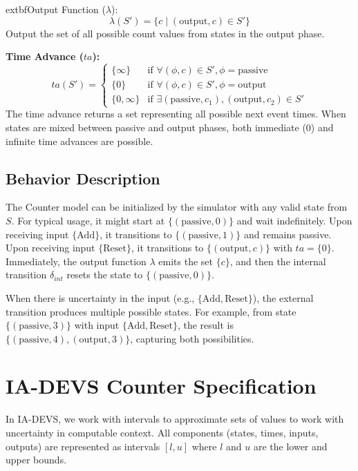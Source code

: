 \bigskip

	extbf{Output Function ($\lambda$):}
\[
\lambda(S') = \{c \mid (\text{output}, c) \in S'\}
\]
Output the set of all possible count values from states in the output phase.

\bigskip

\textbf{Time Advance ($ta$):}
\[
ta(S') = \begin{cases}
    \{\infty\} & \text{if } \forall (\phi, c) \in S', \phi = \text{passive} \\
    \{0\} & \text{if } \forall (\phi, c) \in S', \phi = \text{output} \\
    \{0, \infty\} & \text{if } \exists (\text{passive}, c_1), (\text{output}, c_2) \in S'
\end{cases}
\]
The time advance returns a set representing all possible next event times. When states are mixed between passive and output phases, both immediate (0) and infinite time advances are possible.

\subsection{Behavior Description}

The Counter model can be initialized by the simulator with any valid state from $S$. For typical usage, it might start at $\{(\text{passive}, 0)\}$ and wait indefinitely. Upon receiving input $\{\text{Add}\}$, it transitions to $\{(\text{passive}, 1)\}$ and remains passive. Upon receiving input $\{\text{Reset}\}$, it transitions to $\{(\text{output}, c)\}$ with $ta = \{0\}$. Immediately, the output function $\lambda$ emits the set $\{c\}$, and then the internal transition $\delta_{int}$ resets the state to $\{(\text{passive}, 0)\}$.

When there is uncertainty in the input (e.g., $\{\text{Add}, \text{Reset}\}$), the external transition produces multiple possible states. For example, from state $\{(\text{passive}, 3)\}$ with input $\{\text{Add}, \text{Reset}\}$, the result is $\{(\text{passive}, 4), (\text{output}, 3)\}$, capturing both possibilities.

\section{IA-DEVS Counter Specification}

In IA-DEVS, we work with intervals to approximate sets of values to work with uncertainty in computable context. All components (states, times, inputs, outputs) are represented as intervals $[l, u]$ where $l$ and $u$ are the lower and upper bounds.

